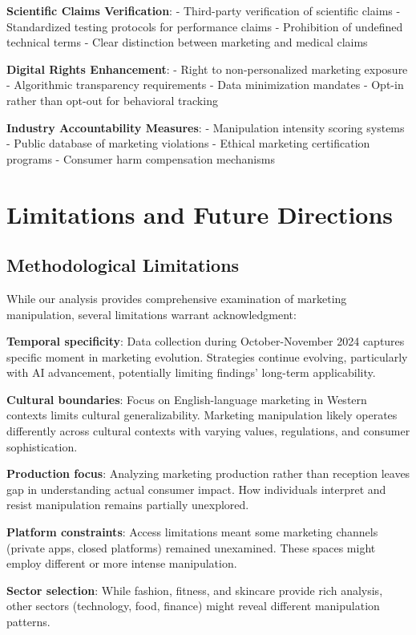 \textbf{Scientific Claims Verification}:
- Third-party verification of scientific claims
- Standardized testing protocols for performance claims
- Prohibition of undefined technical terms
- Clear distinction between marketing and medical claims

\textbf{Digital Rights Enhancement}:
- Right to non-personalized marketing exposure
- Algorithmic transparency requirements
- Data minimization mandates
- Opt-in rather than opt-out for behavioral tracking

\textbf{Industry Accountability Measures}:
- Manipulation intensity scoring systems
- Public database of marketing violations
- Ethical marketing certification programs
- Consumer harm compensation mechanisms

\section{Limitations and Future Directions}
\label{sec:limitations_future}

\subsection{Methodological Limitations}

While our analysis provides comprehensive examination of marketing manipulation, several limitations warrant acknowledgment:

\textbf{Temporal specificity}: Data collection during October-November 2024 captures specific moment in marketing evolution. Strategies continue evolving, particularly with AI advancement, potentially limiting findings' long-term applicability.

\textbf{Cultural boundaries}: Focus on English-language marketing in Western contexts limits cultural generalizability. Marketing manipulation likely operates differently across cultural contexts with varying values, regulations, and consumer sophistication.

\textbf{Production focus}: Analyzing marketing production rather than reception leaves gap in understanding actual consumer impact. How individuals interpret and resist manipulation remains partially unexplored.

\textbf{Platform constraints}: Access limitations meant some marketing channels (private apps, closed platforms) remained unexamined. These spaces might employ different or more intense manipulation.

\textbf{Sector selection}: While fashion, fitness, and skincare provide rich analysis, other sectors (technology, food, finance) might reveal different manipulation patterns.

